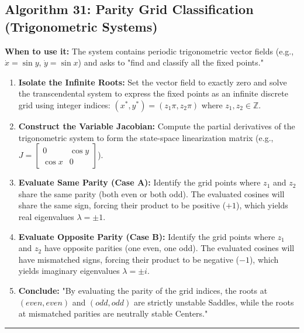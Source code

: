 \documentclass[11pt, a4paper]{report}
\begin{document}
\subsection*{Algorithm 31: Parity Grid Classification (Trigonometric Systems)}
\textbf{When to use it:} The system contains periodic trigonometric vector fields (e.g., $\dot{x} = \sin y$, $\dot{y} = \sin x$) and asks to "find and classify all the fixed points."
\begin{enumerate}[label=\textbf{\arabic*.}]
    \item \textbf{Isolate the Infinite Roots:} Set the vector field to exactly zero and solve the transcendental system to express the fixed points as an infinite discrete grid using integer indices: $(x^*, y^*) = (z_1\pi, z_2\pi)$ where $z_1, z_2 \in \mathbb{Z}$.
    \item \textbf{Construct the Variable Jacobian:} Compute the partial derivatives of the trigonometric system to form the state-space linearization matrix (e.g., $J = [\begin{smallmatrix} 0 & \cos y \\ \cos x & 0 \end{smallmatrix}]$).
    \item \textbf{Evaluate Same Parity (Case A):} Identify the grid points where $z_1$ and $z_2$ share the same parity (both even or both odd). The evaluated cosines will share the same sign, forcing their product to be positive ($+1$), which yields real eigenvalues $\lambda = \pm 1$.
    \item \textbf{Evaluate Opposite Parity (Case B):} Identify the grid points where $z_1$ and $z_2$ have opposite parities (one even, one odd). The evaluated cosines will have mismatched signs, forcing their product to be negative ($-1$), which yields imaginary eigenvalues $\lambda = \pm i$.
    \item \textbf{Conclude:} "By evaluating the parity of the grid indices, the roots at $(even, even)$ and $(odd, odd)$ are strictly unstable Saddles, while the roots at mismatched parities are neutrally stable Centers."
\end{enumerate}
\vspace{1em}
\noindent\rule{\textwidth}{0.4pt}
\vspace{1em}
\end{document}
